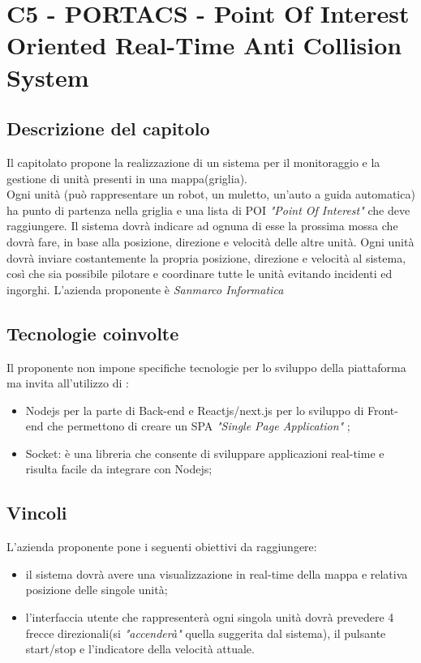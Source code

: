 \section{C5 - PORTACS - Point Of Interest  Oriented Real-Time Anti Collision System}

\subsection{Descrizione del capitolo}
Il capitolato propone la realizzazione di un sistema per il monitoraggio e la gestione di unità presenti in una mappa(griglia).\\
Ogni unità (può rappresentare un robot, un muletto, un'auto a guida automatica) ha punto di partenza nella griglia e una lista di POI \textit{"Point Of Interest"}  che deve raggiungere.
Il sistema dovrà indicare ad ognuna di esse la prossima mossa che dovrà fare, in base alla posizione, direzione e velocità  delle altre unità. Ogni unità dovrà inviare costantemente la propria posizione, direzione e velocità al sistema, così che sia possibile pilotare e coordinare tutte le unità evitando incidenti ed ingorghi.
L'azienda proponente è \textit{Sanmarco Informatica}

\subsection{Tecnologie coinvolte}
Il proponente non impone specifiche tecnologie per lo sviluppo della piattaforma ma invita all'utilizzo di :
\begin{itemize}
\item Nodejs per la parte di Back-end e Reactjs/next.js  per lo sviluppo di Front-end che permettono di creare un SPA \textit{"Single Page Application"} ;
\item Socket: è una libreria che consente di sviluppare applicazioni real-time e risulta facile da integrare con Nodejs;
\end{itemize}

\subsection{Vincoli}
L'azienda proponente pone i seguenti obiettivi da raggiungere:

\begin{itemize}
\item il sistema dovrà avere una visualizzazione in real-time della mappa e relativa posizione delle singole unità;
\item l'interfaccia utente che rappresenterà ogni singola unità  dovrà prevedere 4 frecce direzionali(si \textit{"accenderà"} quella suggerita dal sistema), il pulsante start/stop e l'indicatore della velocità attuale.
\end{itemize}

